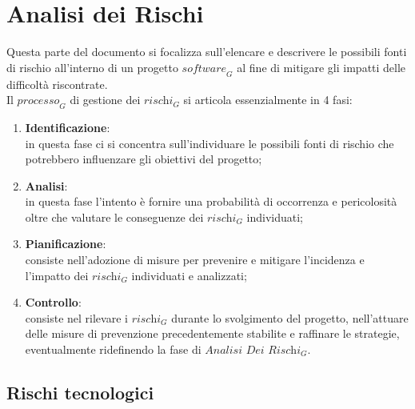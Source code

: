 \section{Analisi dei Rischi}
Questa parte del documento si focalizza sull'elencare e descrivere le possibili fonti di rischio all'interno di un progetto $\textit{software}_G$ al fine di mitigare gli impatti delle difficoltà riscontrate.\\
Il $\textit{processo}_G$ di gestione dei $\textit{rischi}_G$ si articola essenzialmente in 4 fasi:
\begin{enumerate}
    \item \textbf{Identificazione}:\\
    in questa fase ci si concentra sull'individuare le possibili fonti di rischio che potrebbero influenzare gli obiettivi del progetto;
    \item \textbf{Analisi}:\\
    in questa fase l'intento è fornire una probabilità di occorrenza e pericolosità oltre che valutare le conseguenze dei $\textit{rischi}_G$ individuati;
    \item \textbf{Pianificazione}:\\
    consiste nell'adozione di misure per prevenire e mitigare l'incidenza e l'impatto dei $\textit{rischi}_G$ individuati e analizzati;
    \item \textbf{Controllo}:\\
    consiste nel rilevare i $\textit{rischi}_G$ durante lo svolgimento del progetto, nell'attuare delle misure di prevenzione precedentemente stabilite e raffinare le strategie, eventualmente ridefinendo la fase di $\textit{Analisi Dei Rischi}_G$.
\end{enumerate}

\subsection{Rischi tecnologici}
%
%
